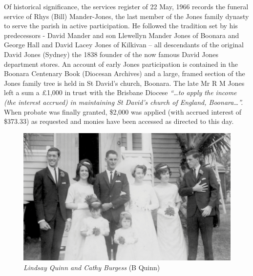 Of historical significance, the services register of 22 May, 1966 records the funeral service of Rhys (Bill) Mander-Jones, the last member of the Jones family dynasty to serve the parish in active participation. He followed the tradition set by his predecessors - David Mander and son Llewellyn Mander Jones of Boonara and George Hall and David Lacey Jones of Kilkivan -- all descendants of the original David Jones (Sydney) the 1838 founder of the now famous David Jones department stores. An account of early Jones participation is contained in the Boonara Centenary Book (Diocesan Archives) and a large, framed section of the Jones family tree is held in St David's church, Boonara. The late Mr R M Jones left a sum a \pounds1,000 in trust with the Brisbane Diocese \emph{``\ldots to apply the income (the interest accrued) in maintaining St David's church of England, Boonara\ldots''.} When probate was finally granted, \$2,000 was applied (with accrued interest of \$373.33) as requested and monies have been accessed as directed to this day.









\begin{figure}[!htb]
\begin{center}
\includegraphics[width=1.\textwidth,center]{../images/LindsayQuinnCathyBurgessWedding.jpg}
\caption{{\itshape Lindsay Quinn and Cathy Burgess} {\scriptsize(B Quinn)}}
\end{center}
\end{figure}




